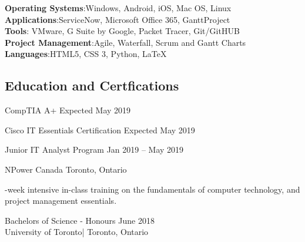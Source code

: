 \documentclass{article}
\begin{document}
\begin{flushleft}
\begin{itemize}

\textbf{Operating Systems}:Windows, Android, iOS, Mac OS, Linux\\
\textbf{Applications}:ServiceNow, Microsoft Office 365, GanttProject\\
\textbf{Tools}: VMware, G Suite by Google, Packet Tracer, Git/GitHUB\\
\textbf{Project Management}:Agile, Waterfall, Scrum and Gantt Charts\\
\textbf{Languages}:HTML5, CSS 3, Python, LaTeX \\
\end{itemize}
\end{flushleft}

\begin{center}
\section*{Education and Certfications}
\end{center}

\begin{doublespacing}

\noindent CompTIA A+    
\hfill Expected May 2019

\noindent Cisco IT Essentials Certification
\hfill Expected May 2019 

\noindent Junior IT Analyst Program 
\hfill Jan 2019 – May 2019 

\noindent NPower Canada \vert   Toronto, Ontario 

-week intensive in-class training on the fundamentals of computer technology, and project management essentials.

\noindent Bachelors of Science - Honours 
\hfill June 2018 
\\University of Toronto| Toronto, Ontario

\end{doublespacing}
\end{document}

